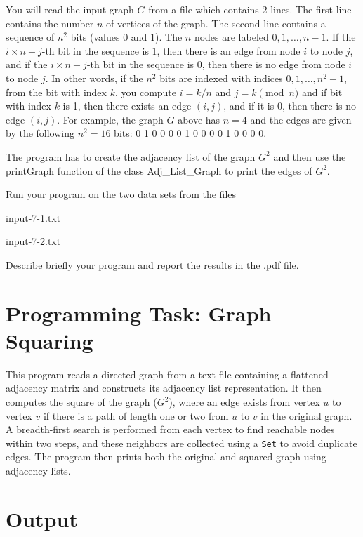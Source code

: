 \documentclass[11pt]{article}
\begin{document}
You will read the input graph $G$ from a file which contains 2 lines. The first line contains the number $n$ of vertices of the graph. The second line contains a sequence of $n^2$  bits (values $0$ and $1$). The $n$ nodes are labeled $0,1, \ldots, n-1$. If the $i \times n + j$-th  bit in the sequence is $1$, then there is an edge from node $i$ to node $j$, and if the $i \times n + j$-th bit in the sequence is $0$,  then there is no edge from node $i$ to node $j$. In other words, if the $n^2$  bits are indexed with indices $0, 1, \ldots, n^2-1$,  from the bit with index $k$, you compute $i=k/n$ and $j = k \pmod{n}$ and if bit with index $k$ is 1, then there exists an edge $(i,j)$, and if it is $0$, then there is no edge $(i, j)$. For example, the graph $G$ above has $n=4$ and the edges are given by the following $n^2 = 16$ bits: 0 1 0 0      0 0 1 0      0 0 0 1   0 0 0 0.

The program has to create the adjacency list of the graph $G^2$ and then use the \textsf{printGraph} function of the class \textsf{Adj\_List\_Graph} to print the edges of $G^2$.

Run your program on the two data sets from the files

input-7-1.txt 

input-7-2.txt

Describe briefly your program and report the results in the .pdf file.
\newpage
\section*{Programming Task: Graph Squaring}

This program reads a directed graph from a text file containing a flattened adjacency matrix and constructs its adjacency list representation. It then computes the square of the graph (\(G^2\)), where an edge exists from vertex \(u\) to vertex \(v\) if there is a path of length one or two from \(u\) to \(v\) in the original graph. A breadth-first search is performed from each vertex to find reachable nodes within two steps, and these neighbors are collected using a \texttt{Set} to avoid duplicate edges. The program then prints both the original and squared graph using adjacency lists.

\bigskip

\section*{Output}
\end{document}
